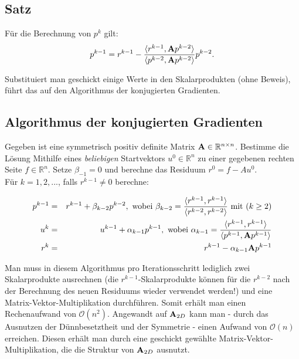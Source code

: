 \subsection{Satz}
Für die Berechnung von $p^{k}$ gilt:
\begin{equation}
p^{k-1} = r^{k-1} - \frac {\langle r^{k-1}, {\textbf{A}}p^{k-2} \rangle} {\langle p^{k-2}, {\textbf{A}}p^{k-2} \rangle} p^{k-2}.
\end{equation}

Substituiert man geschickt einige Werte in den Skalarprodukten (ohne Beweis), führt das auf den Algorithmus der konjugierten Gradienten.

\subsection{Algorithmus der konjugierten Gradienten}\label{ss.Numerisches CG}

Gegeben ist eine symmetrisch positiv definite Matrix ${\textbf{A}} \in \mathbb{R}^{n \times n}$. Bestimme die Lösung Mithilfe eines \textit{beliebigen} Startvektors $u^{0} \in \mathbb{R}^{n}$ zu einer gegebenen rechten Seite $f \in \mathbb{R}^{n}$. Setze $\beta_{-1} = 0$ und berechne das Residuum $r^{0} = f - Au^{0}$. \\
Für $k = 1,2,...$, falls $r^{k-1} \ne 0$ berechne:

\begin{eqnarray}
p^{k-1} &=& r^{k-1} + \beta_{k-2}p^{k-2}, \textnormal{ wobei } \beta_{k-2} = \frac {\langle r^{k-1}, r^{k-1} \rangle} {\langle r^{k-2}, r^{k-2} \rangle} \textnormal{ mit } (k \ge 2) \notag \\
u^{k} &=& u^{k-1} + \alpha_{k-1}p^{k-1}, \textnormal{ wobei } \alpha_{k-1} = \frac {\langle r^{k-1}, r^{k-1} \rangle} {\langle p^{k-1}, {\textbf{A}}p^{k-1} \rangle} \notag \\
r^{k} &=& r^{k-1} - \alpha_{k-1}{\textbf{A}}p^{k-1} \notag
\end{eqnarray}

Man muss in diesem Algorithmus pro Iterationsschritt lediglich zwei Skalarprodukte ausrechnen (die $r^{k-1}$-Skalarprodukte können für die $r^{k-2}$ nach der Berechnung des neuen Residuums wieder verwendet werden!) und eine Matrix-Vektor-Multiplikation durchführen. Somit erhält man einen Rechenaufwand von $\mathcal{O}(n^{2})$. Angewandt auf ${\textbf{A}}_{2D}$ kann man - durch das Ausnutzen der Dünnbesetztheit und der Symmetrie - einen Aufwand von $\mathcal{O}(n)$ erreichen. Diesen erhält man durch eine geschickt gewählte Matrix-Vektor-Multiplikation, die die Struktur von ${\textbf{A}}_{2D}$ ausnutzt.

